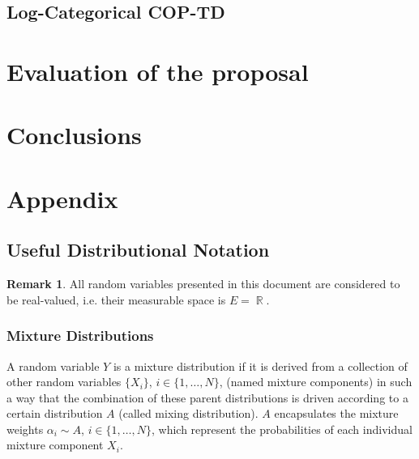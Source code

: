 \documentclass[12pt,a4paper,openright,twoside]{article}
\DeclareMathOperator*{\R}{\mathbb{R}}
\numberwithin{equation}{section}
\theoremstyle{definition}
\newtheorem*{remark}{Remark}
\theoremstyle{remark}
\theoremstyle{plain}
\begin{document}
\subsection{Log-Categorical COP-TD}


\newpage 

\thispagestyle{plain}
\section{Evaluation of the proposal}



\newpage

\thispagestyle{plain}
\section{Conclusions}


\newpage

\appendix
\pagestyle{fancy}
\renewcommand{\sectionmark}[1]{\markboth{#1}{}}
\renewcommand{\subsectionmark}[1]{\markright{\thesubsection.\quad #1}}

\thispagestyle{plain}
\section*{Appendix}
\sectionmark{Appendix}

\setcounter{section}{1}
\setcounter{theorem}{0}
\setcounter{equation}{0}

\subsection{Useful Distributional Notation}
\begin{remark}
All random variables presented in this document are considered to be real-valued, i.e. their measurable space is $E= \R$. 
\end{remark}

\subsubsection*{Mixture Distributions}

A random variable $Y$ is a mixture distribution if it is derived from a collection of other random variables $\{X_i\}$, $i\in \{1, \dots, N\}$, (named mixture components) in such a way that the combination of these parent distributions is driven according to a certain distribution $A$ (called mixing distribution). $A$ encapsulates the mixture weights $\alpha_i \sim A$, $i\in \{1, \dots, N\}$, which represent the probabilities of each individual mixture component $X_i$. 
\end{document}
